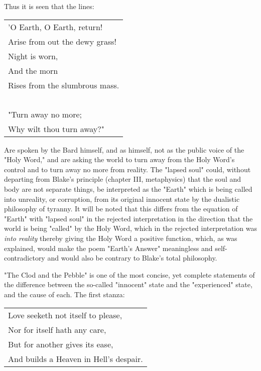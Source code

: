 \hspace*{5mm}Thus it is seen that the lines:\par
\begin{center}
	\begin{tabular}{l}
		'O Earth, O Earth, return!     \\
		Arise from out the dewy grass! \\
		Night is worn,                 \\
		And the morn                   \\
		Rises from the slumbrous mass. \\
		~                              \\
		"Turn away no more;            \\
		Why wilt thou turn away?"
	\end{tabular}
\end{center}
Are spoken by the Bard himself, and as himself, not as the public voice
of the "Holy Word," and are asking the world to turn away from the Holy Word's
control and to turn away no more from reality. The "lapsed soul" could, without departing
from Blake's principle (chapter III, metaphysics) that the soul and body are not separate
things, be interpreted as the "Earth" which is being called into unreality, or corruption, from
its original innocent state by the dualistic philosophy of tyranny. It will be noted that this
differs from the equation of "Earth" with "lapsed soul" in the rejected interpretation in the
direction that the world is being "called" by the Holy Word, which in the rejected interpretation
was \textit{into reality} thereby giving the Holy Word a positive function, which, as was explained,
would make the poem "Earth's Answer" meaningless and self-contradictory and would also be contrary
to Blake's total philosophy.\par
\vspace*{0.5\baselineskip}
"The Clod and the Pebble" is one of the most concise, yet complete statements of the difference between the
so-called "innocent" state and the "experienced" state, and the cause of each. The first stanza:\par
\begin{center}
	\begin{tabular}{l}
		Love seeketh not itself to please, \\
		Nor for itself hath any care,      \\
		But for another gives its ease,    \\
		And builds a Heaven in Hell's despair.
	\end{tabular}
\end{center}
